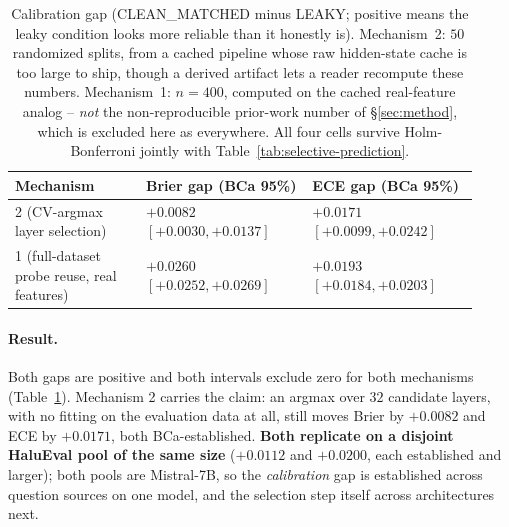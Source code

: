 \documentclass{article}
\begin{document}
\begin{table}[t]
\centering
\small
{\setlength{\tabcolsep}{3pt}
\begin{tabular}{@{}p{0.26\linewidth}p{0.33\linewidth}p{0.33\linewidth}@{}}
\toprule
Mechanism & Brier gap (BCa 95\%) & ECE gap (BCa 95\%) \\
\midrule
2 (CV-argmax layer selection) & $+0.0082$ \newline $[+0.0030,+0.0137]$ & $+0.0171$ \newline $[+0.0099,+0.0242]$ \\
1 (full-dataset probe reuse, real features) & $+0.0260$ \newline $[+0.0252,+0.0269]$ & $+0.0193$ \newline $[+0.0184,+0.0203]$ \\
\bottomrule
\end{tabular}}
\caption{Calibration gap (CLEAN\_MATCHED minus LEAKY; positive means the
leaky condition looks more reliable than it honestly is). Mechanism~2:
$50$ randomized splits, from a cached pipeline whose raw hidden-state cache is
too large to ship, though a derived artifact lets a reader recompute these
numbers. Mechanism~1: $n{=}400$, computed on the cached
real-feature analog -- \emph{not} the non-reproducible prior-work number of
\S\ref{sec:method}, which is excluded here as everywhere. All four cells
survive Holm-Bonferroni jointly with Table~\ref{tab:selective-prediction}.}
\label{tab:calibration-bridge}
\end{table}

\paragraph{Result.} Both gaps are positive and both intervals exclude zero
for both mechanisms (Table~\ref{tab:calibration-bridge}). Mechanism 2 carries
the claim: an argmax over $32$ candidate layers, with no fitting on the
evaluation data at all, still moves Brier by $+0.0082$ and ECE by $+0.0171$, both
BCa-established. \textbf{Both replicate on a disjoint
HaluEval pool of the same size} ($+0.0112$ and $+0.0200$, each established
and larger); both pools are Mistral-7B, so the \emph{calibration} gap is
established across question sources on one model, and the selection step
itself across architectures next.
\end{document}
